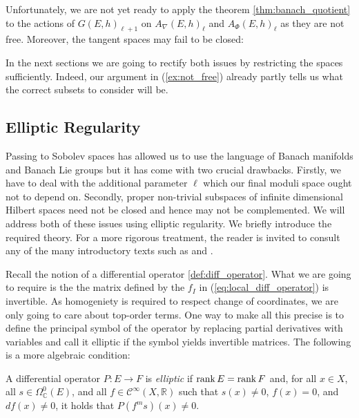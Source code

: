 \documentclass[12pt]{ociamthesis}  %
\begin{document}
Unfortunately, we are not yet ready to apply the theorem \ref{thm:banach_quotient} to
the actions of $G(E,h)_{\ell+1}$ on $A_\nabla(E,h)_\ell$ and
$A_\Phi(E,h)_\ell$ as they are not free. Moreover, the tangent spaces
may fail to be closed:

\begin{example}
  \missingexample
\end{example}

In the next sections we are going to rectify both issues by restricting the spaces
sufficiently. Indeed, our argument in (\ref{ex:not_free}) already partly tells us
what the correct subsets to consider will be.

\subsection{Elliptic Regularity}\label{sec:elliptic_regularity}

Passing to Sobolev spaces has allowed us to use the language of
Banach manifolds and Banach Lie groups but it has come with two
crucial drawbacks. Firstly, we have to deal with the additional
parameter $\ell$ which our final moduli space ought not to depend on.
Secondly, proper non-trivial subspaces of infinite dimensional Hilbert
spaces need not be closed and hence may not be complemented.
We will address both of these issues using elliptic regularity.
We briefly introduce the required theory.
For a more rigorous treatment, the reader is invited to consult
any of the many introductory texts such as \cite{hance2014} and
\cite[Chapter 6]{warner1983}.

Recall the notion of a differential operator \ref{def:diff_operator}.
What we are going to require is the the matrix defined by the
$f_I$ in (\ref{eq:local_diff_operator}) is invertible.
As homogeniety is required to respect change of coordinates,
we are only going to care about top-order terms. One way to make all
this precise is to define the principal symbol of the operator by
replacing partial derivatives with variables and
call it elliptic if the symbol yields invertible matrices.
The following is a more algebraic condition:

\begin{definition}\label{def:elliptic_operator}
  A differential operator $P:E\to F$ is \emph{elliptic} if
  $\operatorname{rank} E = \operatorname{rank} F$ and, for all $x\in X$, all $s\in\Omega^0_{\mathbb C}(E)$,
  and all $f\in \mathscr C^\infty(X,\mathbb R)$ such that $s(x) \neq 0$,
  $f(x) = 0$, and $df(x) \neq 0$, it holds that $P(f^m s)(x) \neq 0$.
\end{definition}
\end{document}
